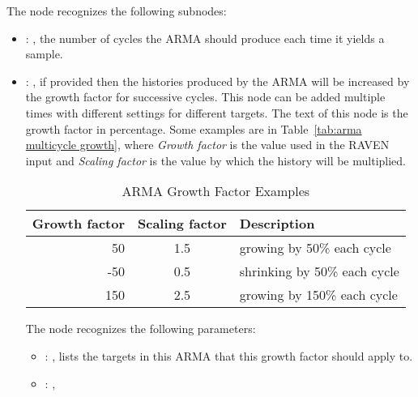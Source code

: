 \begin{itemize}
      The  node recognizes the following subnodes:
      \begin{itemize}
        \item {}: , 
          the number of cycles the ARMA should produce
          each time it yields a sample.

        \item {}: , 
          if provided then the histories produced by
          the ARMA will be increased by the growth factor for successive cycles. This node can be
          added                                                    multiple times with different
          settings for different targets.                                                    The
          text of this node is the growth factor in percentage. Some examples are in
          Table~\ref{tab:arma multicycle growth}, where \emph{Growth factor} is the value used in
          the RAVEN                                                    input and \emph{Scaling
          factor} is the value by which the history will be multiplied.
          \begin{table}[h!]                                                      \centering
          \begin{tabular}{r c l}                                                        Growth
          factor & Scaling factor & Description \\ \hline
          50 & 1.5 & growing by 50\% each cycle \\
          -50 & 0.5 & shrinking by 50\% each cycle \\
          150 & 2.5 & growing by 150\% each cycle \\
          \end{tabular}                                                      \caption{ARMA Growth
          Factor Examples}                                                      \label{tab:arma
          multicycle growth}                                                    \end{table}
          The  node recognizes the following parameters:
            \begin{itemize}
              \item {}: , 
                lists the targets                     in this ARMA that this growth factor should
                apply to.
              \item {}: , 

\end{itemize}
\end{itemize}
\end{itemize}
